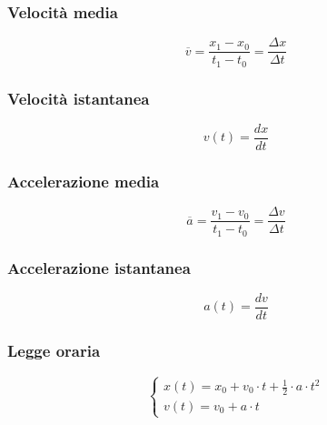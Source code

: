 \documentclass[twoside]{article}
\begin{document}
\subsubsection{Velocità media}
\begin{equation}
  \boxed{\overline{v} = \frac{x_1-x_0}{t_1-t_0} = \frac{\Delta x}{\Delta t}}
\end{equation}
\subsubsection{Velocità istantanea}
\begin{equation}
  \boxed{v(t) = \frac{dx}{dt}}
\end{equation}
\subsubsection{Accelerazione media}
\begin{equation}
  \boxed{\overline{a} = \frac{v_1-v_0}{t_1-t_0} = \frac{\Delta v}{\Delta t}}
\end{equation}
\subsubsection{Accelerazione istantanea}
\begin{equation}
  \boxed{a(t) = \frac{dv}{dt} }
\end{equation}
\subsubsection{Legge oraria}
\begin{equation}
  \boxed{\begin{cases}
      x(t) = x_0 + v_0 \cdot t + \frac{1}{2} \cdot a \cdot t^2 \\
      v(t) = v_0 + a \cdot t
    \end{cases}}
\end{equation}
\end{document}
